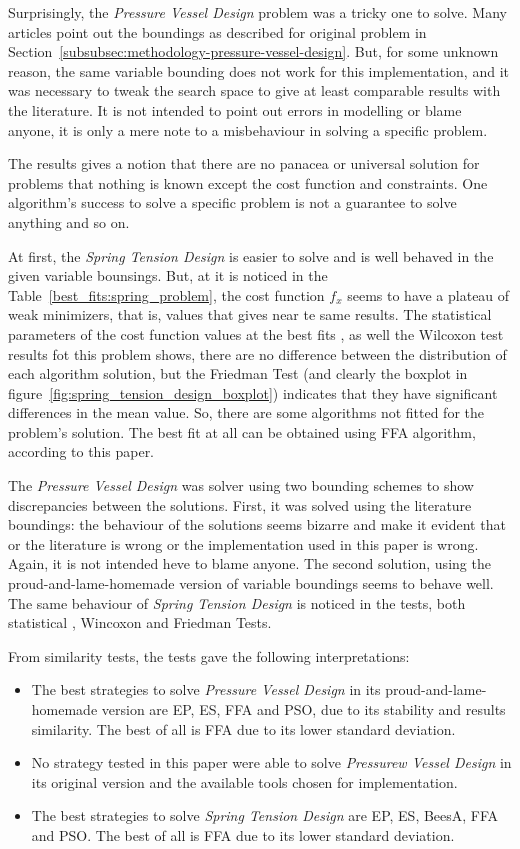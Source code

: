 \documentclass[conference]{IEEEtran}
\begin{document}
Surprisingly, the \textit{Pressure Vessel Design} problem was a tricky one to solve.
Many articles point out the boundings as described for original problem
in Section~\ref{subsubsec:methodology-pressure-vessel-design}.
But, for some unknown reason, the same variable bounding does not work for this
implementation, and it was necessary to tweak the search space to give at least
comparable results with the literature.
It is not intended to point out errors in modelling or blame anyone, it is only a mere
note to a misbehaviour in solving a specific problem.

The results gives a notion that there are no panacea or universal solution for problems that
nothing is known except the cost function and constraints.
One algorithm's success to solve a specific problem is not a guarantee to solve anything
and so on.

At first, the \textit{Spring Tension Design} is easier to solve and is well behaved in the
given variable bounsings. But, at it is noticed in the Table~\ref{best_fits:spring_problem},
the cost function $f_x$ seems to have a plateau of weak minimizers, that is, values that gives
near te same results. The statistical parameters of the cost function values at the best fits
, as well the Wilcoxon test results fot this problem shows, there are no difference between the
distribution of each algorithm solution, but the Friedman Test (and clearly the boxplot in
figure~\ref{fig:spring_tension_design_boxplot}) indicates that they have significant
differences in the mean value. So, there are some algorithms not fitted for the problem's solution.
The best fit at all can be obtained using FFA algorithm, according to this paper.

The \textit{Pressure Vessel Design} was solver using two bounding schemes to show discrepancies
between the solutions.
First, it was solved using the literature boundings: the behaviour of the
solutions seems bizarre and make it evident that or the literature is wrong or the implementation
used in this paper is wrong.
Again, it is not intended heve to blame anyone.
The second solution, using the proud-and-lame-homemade
version of variable boundings seems to behave well.
The same behaviour of \textit{Spring Tension Design} is noticed in the tests, both statistical
, Wincoxon and Friedman Tests.

From similarity tests, the tests gave the following interpretations:

\begin{itemize}
    \item The best strategies to solve \textit{Pressure Vessel Design} in its proud-and-lame-homemade version
    are EP, ES, FFA and PSO, due to its stability and results similarity. The best of all is FFA due to its
    lower standard deviation.
    \item No strategy tested in this paper were able to solve \textit{Pressurew Vessel Design} in its original
    version and the available tools chosen for implementation.
    \item The best strategies to solve \textit{Spring Tension Design} are EP, ES, BeesA, FFA and PSO. The best of
    all is FFA due to its lower standard deviation.
\end{itemize}
\end{document}
